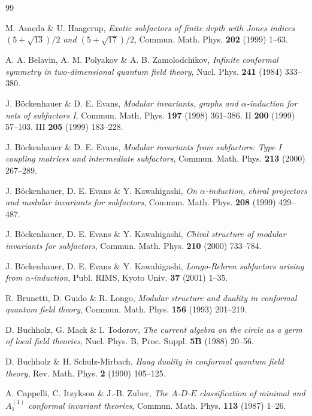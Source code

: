 \documentclass[12pt]{article}
\def\a{\alpha}
\begin{document}
{\footnotesize \begin{thebibliography}{99}

M. Asaeda \& U. Haagerup,
{\it Exotic subfactors of finite depth with Jones indices
${(5+\sqrt{13})}/{2}$ and ${(5+\sqrt{17})}/{2}$},
Commun. Math. Phys. {\bf 202} (1999) 1--63.

A. A. Belavin, A. M. Polyakov \& A. B. Zamolodchikov, 
{\it Infinite conformal symmetry in two-dimensional quantum field theory}, 
Nucl. Phys. {\bf 241} (1984) 333--380.

J. B\"ockenhauer \& D. E. Evans,
{\it Modular invariants, graphs and $\alpha$-induction for
nets of subfactors I},
Commun. Math. Phys. {\bf 197} (1998) 361--386. II
{\bf 200} (1999) 57--103. III {\bf 205} (1999) 183--228.

J. B\"ockenhauer \& D. E. Evans, 
{\it Modular invariants from subfactors: Type I coupling matrices and
intermediate subfactors}, 
Commun. Math. Phys. {\bf 213} (2000) 267--289.

J. B\"ockenhauer, D. E. Evans \& Y. Kawahigashi,
{\it On $\a$-induction, chiral projectors
and modular invariants for subfactors},
Commun. Math. Phys.  {\bf 208} (1999) 429--487.

J. B\"ockenhauer, D. E. Evans \& Y. Kawahigashi,
{\it Chiral structure of modular
invariants for subfactors}, 
Commun. Math. Phys. {\bf 210} (2000) 733--784.

J. B\"ockenhauer, D. E. Evans \& Y. Kawahigashi,
{\it Longo-Rehren subfactors arising from $\alpha$-induction},
Publ. RIMS, Kyoto Univ. {\bf 37} (2001) 1--35.

 R. Brunetti, D. Guido \& R. Longo,
{\it Modular structure and duality in conformal
quantum field theory}, Commun. Math. Phys.
{\bf 156} (1993) 201--219.

 D. Buchholz, G. Mack \& I. Todorov,
{\it The current algebra on the circle as a germ of local field theories}, 
Nucl. Phys. B, Proc. Suppl. {\bf 5B} (1988) 20--56.

 D. Buchholz \& H. Schulz-Mirbach,
{\it Haag duality in conformal quantum field theory}, Rev. Math. 
Phys. {\bf 2} (1990) 105--125.

A. Cappelli, C. Itzykson \& J.-B. Zuber,
{\it The $A$-$D$-$E$ classification of minimal and
$A^{(1)}_1$ conformal invariant theories},
Commun. Math. Phys.  {\bf 113}  (1987) 1--26.


\end{thebibliography}}
\end{document}
